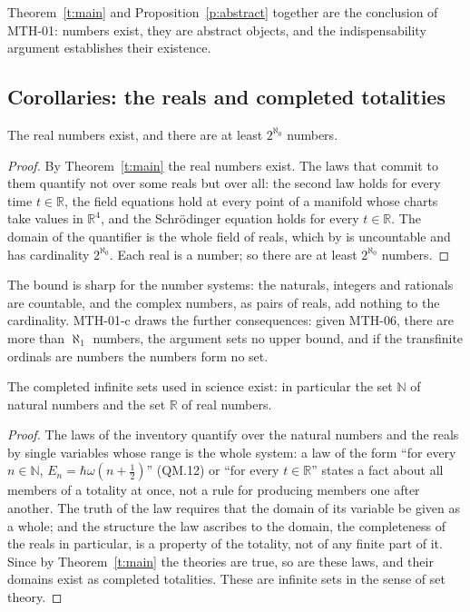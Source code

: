 \documentclass{situationist-preprint}
\begin{document}
Theorem~\ref{t:main} and Proposition~\ref{p:abstract} together are the conclusion of MTH-01: numbers exist, they are abstract objects, and the indispensability argument establishes their existence.

\subsection{Corollaries: the reals and completed totalities}

\begin{corollary}\label{c:reals}
The real numbers exist, and there are at least $2^{\aleph_0}$ numbers.
\end{corollary}

\begin{proof}
By Theorem~\ref{t:main} the real numbers exist. The laws that commit to them quantify not over some reals but over all: the second law holds for every time $t \in \mathbb R$, the field equations hold at every point of a manifold whose charts take values in $\mathbb R^4$, and the Schr\"odinger equation holds for every $t \in \mathbb R$. The domain of the quantifier is the whole field of reals, which by \citet{Cantor1874} is uncountable and has cardinality $2^{\aleph_0}$. Each real is a number; so there are at least $2^{\aleph_0}$ numbers.
\end{proof}

The bound is sharp for the number systems: the naturals, integers and rationals are countable, and the complex numbers, as pairs of reals, add nothing to the cardinality. MTH-01-c draws the further consequences: given MTH-06, there are more than $\aleph_1$ numbers, the argument sets no upper bound, and if the transfinite ordinals are numbers the numbers form no set.

\begin{corollary}\label{c:complete}
The completed infinite sets used in science exist: in particular the set $\mathbb N$ of natural numbers and the set $\mathbb R$ of real numbers.
\end{corollary}

\begin{proof}
The laws of the inventory quantify over the natural numbers and the reals by single variables whose range is the whole system: a law of the form \enquote{for every $n \in \mathbb N$, $E_n = \hbar\omega(n + \frac12)$} (QM.12) or \enquote{for every $t \in \mathbb R$} states a fact about all members of a totality at once, not a rule for producing members one after another. The truth of the law requires that the domain of its variable be given as a whole; and the structure the law ascribes to the domain, the completeness of the reals in particular, is a property of the totality, not of any finite part of it. Since by Theorem~\ref{t:main} the theories are true, so are these laws, and their domains exist as completed totalities. These are infinite sets in the sense of set theory.
\end{proof}
\end{document}
